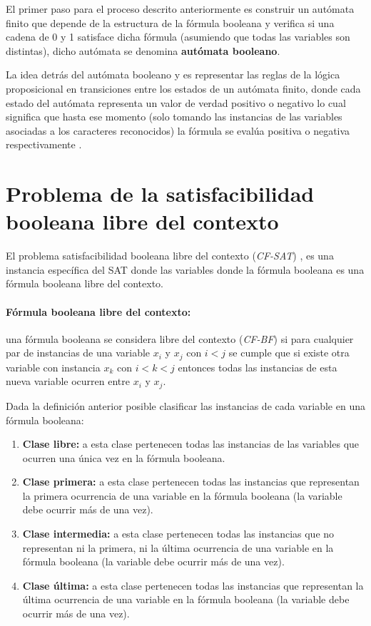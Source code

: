 El primer paso para el proceso descrito anteriormente es construir un autómata finito que depende de la estructura de la fórmula booleana
y verifica si una cadena de 0 y 1 satisface dicha fórmula (asumiendo que todas las variables son distintas), dicho autómata se denomina
\textbf{autómata booleano}.

La idea detrás del autómata booleano y es representar las reglas de la lógica proposicional en transiciones
entre los estados de un autómata finito, donde cada estado del autómata representa un valor de verdad positivo o
negativo lo cual significa que hasta ese momento (solo tomando las instancias de las variables asociadas a los
caracteres reconocidos) la fórmula se evalúa positiva o negativa respectivamente \cite{aCFSAT}.


\section{Problema de la satisfacibilidad booleana libre del contexto}

El problema satisfacibilidad booleana libre del contexto (\textit{CF-SAT}) \cite{aCFSAT}, es una instancia específica
del SAT donde las variables donde la fórmula booleana es una fórmula booleana libre del contexto.

\paragraph{Fórmula booleana libre del contexto:} una fórmula booleana se considera libre del contexto
(\textit{CF-BF}) si para cualquier par de instancias de una variable $x_i$ y $x_j$ con $i<j$ se
cumple que si existe otra variable con instancia $x_k$ con $i<k<j$ entonces todas las instancias de esta nueva
variable ocurren entre $x_i$ y $x_j$.

Dada la definición anterior posible clasificar las instancias de cada variable en una fórmula booleana:

\begin{enumerate}
      \item \textbf{Clase libre:} a esta clase pertenecen todas las instancias de las variables que ocurren
            una única vez en la fórmula booleana.
      \item \textbf{Clase primera:} a esta clase pertenecen todas las instancias que representan la primera
            ocurrencia de una variable en la fórmula booleana (la variable debe ocurrir más de una vez).
      \item \textbf{Clase intermedia:} a esta clase pertenecen todas las instancias que no representan ni la primera, ni la última
            ocurrencia de una variable en la fórmula booleana (la variable debe ocurrir más de una vez).
      \item \textbf{Clase última:} a esta clase pertenecen todas las instancias que representan la última
            ocurrencia de una variable en la fórmula booleana (la variable debe ocurrir más de una vez).
\end{enumerate}

